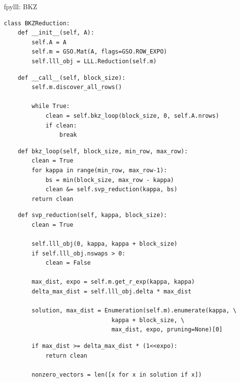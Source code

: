 \documentclass[presentation,smaller]{beamer}
\begin{document}
\begin{frame}{fpylll: BKZ}
 \lstset{language=sage,label= ,caption= ,captionpos=b,numbers=none}
\begin{lstlisting}
class BKZReduction:
    def __init__(self, A):
        self.A = A
        self.m = GSO.Mat(A, flags=GSO.ROW_EXPO)
        self.lll_obj = LLL.Reduction(self.m)
\end{lstlisting}

\lstset{language=sage,label= ,caption= ,captionpos=b,numbers=none}
\begin{lstlisting}
    def __call__(self, block_size):
        self.m.discover_all_rows()

        while True:
            clean = self.bkz_loop(block_size, 0, self.A.nrows)
            if clean:
                break
\end{lstlisting}

\lstset{language=sage,label= ,caption= ,captionpos=b,numbers=none}
\begin{lstlisting}
    def bkz_loop(self, block_size, min_row, max_row):
        clean = True
        for kappa in range(min_row, max_row-1):
            bs = min(block_size, max_row - kappa)
            clean &= self.svp_reduction(kappa, bs)
        return clean
\end{lstlisting}

\framebreak

\lstset{language=sage,label= ,caption= ,captionpos=b,numbers=none}
\begin{lstlisting}
    def svp_reduction(self, kappa, block_size):
        clean = True

        self.lll_obj(0, kappa, kappa + block_size)
        if self.lll_obj.nswaps > 0:
            clean = False

        max_dist, expo = self.m.get_r_exp(kappa, kappa)
        delta_max_dist = self.lll_obj.delta * max_dist

        solution, max_dist = Enumeration(self.m).enumerate(kappa, \
                               kappa + block_size, \
                               max_dist, expo, pruning=None)[0]
\end{lstlisting}

\framebreak

\lstset{language=sage,label= ,caption= ,captionpos=b,numbers=none}
\begin{lstlisting}
        if max_dist >= delta_max_dist * (1<<expo):
            return clean

        nonzero_vectors = len([x for x in solution if x])


\end{lstlisting}
\end{frame}
\end{document}
